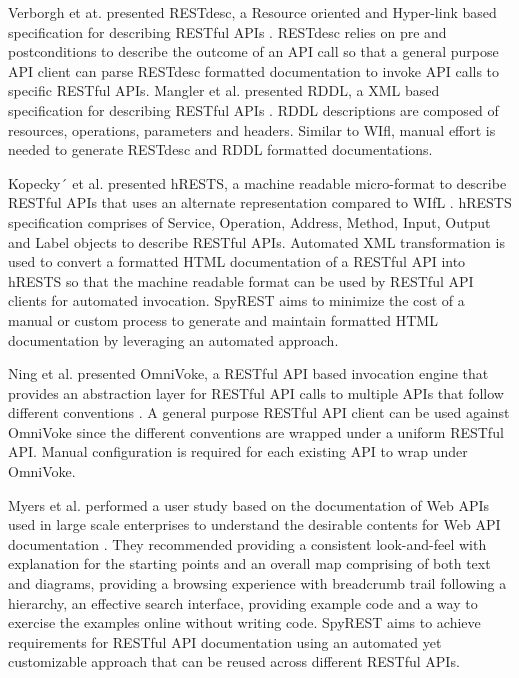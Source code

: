 \documentclass[conference]{IEEEtran}
\begin{document}
Verborgh et at. presented RESTdesc, a Resource oriented and Hyper-link based specification for describing RESTful APIs \cite{Verborgh_functional}. RESTdesc relies on pre and postconditions to describe the outcome of an API call so that a general purpose API client can parse RESTdesc formatted documentation to invoke API calls to specific RESTful APIs. Mangler et al. presented RDDL, a XML based specification for describing RESTful APIs \cite{Mangler_rddl}. RDDL descriptions are composed of resources, operations, parameters and headers. Similar to WIfl, manual effort is needed to generate RESTdesc and RDDL formatted documentations.

Kopecky´ et al. presented hRESTS, a machine readable micro-format to describe RESTful APIs that uses an alternate representation compared to WIfL \cite{Kopecky_hrests}. hRESTS specification comprises of Service, Operation, Address, Method, Input, Output and Label objects to describe RESTful APIs. Automated XML transformation is used to convert a formatted HTML documentation of a RESTful API into hRESTS so that the machine readable format can be used by RESTful API clients for automated invocation. SpyREST aims to minimize the cost of a manual or custom process to generate and maintain formatted HTML documentation by leveraging an automated approach.

Ning et al. presented OmniVoke, a RESTful API based invocation engine that provides an abstraction layer for RESTful API calls to multiple APIs that follow different conventions \cite{Ning_omnivoke}. A general purpose RESTful API client can be used against OmniVoke since the different conventions are wrapped under a uniform RESTful API. Manual configuration is required for each existing API to wrap under OmniVoke.

Myers et al. performed a user study based on the documentation of Web APIs used in large scale enterprises to understand the desirable contents for Web API documentation \cite{Myers_study}. They recommended providing a consistent look-and-feel with explanation for the starting points and an overall map comprising of both text and diagrams, providing a browsing experience with breadcrumb trail following a hierarchy, an effective search interface, providing example code and a way to exercise the examples online without writing code. SpyREST aims to achieve requirements for RESTful API documentation using an automated yet customizable approach that can be reused across different RESTful APIs.
\end{document}
